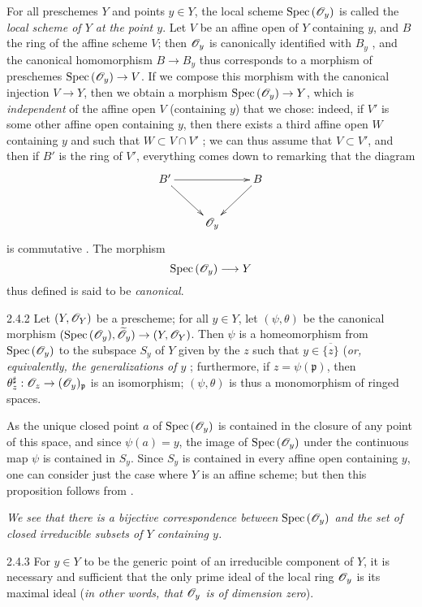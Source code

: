 For all preschemes $Y$ and points $y\in Y$, the local scheme ${\mathop{\mathrm{Spec}}\nolimits}\,(\mathscr{O}_y)$
is called the \emph{local scheme of $Y$ at the point $y$}. Let $V$ be an affine
open of $Y$ containing $y$, and $B$ the ring of the affine scheme $V$; then
$\mathscr{O}_y$ is canonically identified with $B_y$ , and the canonical
homomorphism $B\to B_y$ thus corresponds  to a morphism of preschemes
${\mathop{\mathrm{Spec}}\nolimits}\,(\mathscr{O}_y)\to V$. If we compose this morphism with the canonical injection
$V\to Y$, then we obtain a morphism ${\mathop{\mathrm{Spec}}\nolimits}\,(\mathscr{O}_y)\to Y$, which is
\emph{independent} of the affine open $V$ (containing $y$) that we chose:
indeed, if $V'$ is some other affine open containing $y$, then there exists a
third affine open $W$ containing $y$ and such that $W\subset V\cap V'$ ;
we can thus assume that $V\subset V'$, and then if $B'$ is the ring of $V'$,
everything comes down to remarking that the diagram
\[
  \xymatrix{
    B'\ar[rr]\ar[dr] & & B\ar[dl]\\
    & \OO_y &
  }
\]
is commutative . The morphism
\[
  {\mathop{\mathrm{Spec}}\nolimits}\,(\mathscr{O}_y)\longrightarrow Y
\]
thus defined is said to be \emph{canonical}.
    
\begin{envs}[Proposition]{2.4.2}
\label{prop-1.2.4.2}
Let $(Y,\mathscr{O}_Y)$ be a prescheme; for all $y\in Y$, let $(\psi,\theta)$ be the canonical
morphism $({\mathop{\mathrm{Spec}}\nolimits}\,(\mathscr{O}_y),\widetilde{\mathscr{O}}_y)\to(Y,\mathscr{O}_Y)$. Then $\psi$ is a homeomorphism
from ${\mathop{\mathrm{Spec}}\nolimits}\,(\mathscr{O}_y)$ to the subspace $S_y$ of $Y$ given by the $z$ such that
$y\in\overline{\{z\}}$ (\emph{or, equivalently, the generalizations of $y$
}; furthermore, if $z=\psi(\mathfrak{p})$, then
$\theta_z^\sharp:\mathscr{O}_z\to(\mathscr{O}_y)_\mathfrak{p}$ is an isomorphism; $(\psi,\theta)$
is thus a monomorphism of ringed spaces.
\end{envs}
    
As the unique closed point $a$ of ${\mathop{\mathrm{Spec}}\nolimits}\,(\mathscr{O}_y)$ is contained in the closure of any
point of this space, and since $\psi(a)=y$, the image of ${\mathop{\mathrm{Spec}}\nolimits}\,(\mathscr{O}_y)$ under
the continuous map $\psi$ is contained in $S_y$. Since $S_y$ is contained in
every affine open containing $y$, one can consider just the case where $Y$ is an
affine scheme; but then this proposition follows from .
    
\emph{We see  that there is a bijective correspondence between
${\mathop{\mathrm{Spec}}\nolimits}\,(\mathscr{O}_y)$ and the set of closed irreducible subsets of $Y$ containing $y$.}
    
\begin{envs}[Corollary]{2.4.3}
\label{cor-1.2.4.3}
For $y\in Y$ to be the generic point of an
irreducible component of $Y$, it is necessary and sufficient that the only prime
ideal of the local ring $\mathscr{O}_y$ is its maximal ideal (\emph{in other words, that
$\mathscr{O}_y$ is of \emph{dimension zero}}).
\end{envs}
    
